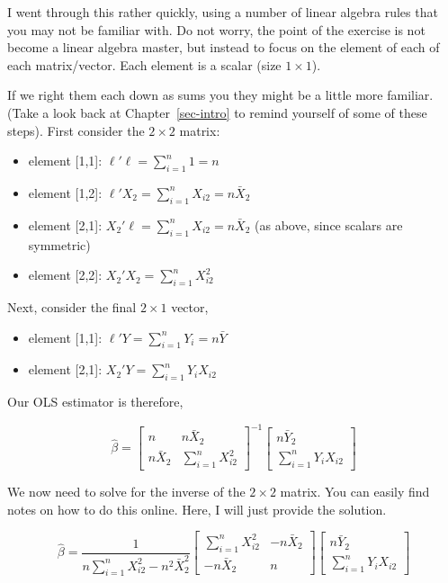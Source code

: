 \documentclass[
  letterpaper,
  DIV=11,
  numbers=noendperiod]{scrreprt}
\begin{document}
I went through this rather quickly, using a number of linear algebra
rules that you may not be familiar with. Do not worry, the point of the
exercise is not become a linear algebra master, but instead to focus on
the element of each of each matrix/vector. Each element is a scalar
(size \(1\times 1\)).

If we right them each down as sums you they might be a little more
familiar. (Take a look back at Chapter~\ref{sec-intro} to remind
yourself of some of these steps). First consider the \(2\times 2\)
matrix:

\begin{itemize}
\item
  element {[}1,1{]}: \(\ell'\ell = \sum_{i=1}^n 1 = n\)
\item
  element {[}1,2{]}: \(\ell'X_2 = \sum_{i=1}^nX_{i2} = n\bar{X}_2\)
\item
  element {[}2,1{]}: \(X_2'\ell = \sum_{i=1}^nX_{i2} = n\bar{X}_2\) (as
  above, since scalars are symmetric)
\item
  element {[}2,2{]}: \(X_2'X_2=\sum_{i=1}^nX_{i2}^2\)
\end{itemize}

Next, consider the final \(2\times 1\) vector,

\begin{itemize}
\item
  element {[}1,1{]}: \(\ell'Y = \sum_{i=1}^n Y_i = n\bar{Y}\)
\item
  element {[}2,1{]}: \(X_2'Y = \sum_{i=1}^nY_iX_{i2}\)
\end{itemize}

Our OLS estimator is therefore,

\[
\hat{\beta} = \begin{bmatrix} n & n\bar{X}_2 \\ n\bar{X}_2 & \sum_{i=1}^nX_{i2}^2 \end{bmatrix}^{-1}\begin{bmatrix}n\bar{Y}_2  \\ \sum_{i=1}^nY_iX_{i2} \end{bmatrix}
\]

We now need to solve for the inverse of the \(2\times 2\) matrix. You
can easily find notes on how to do this online. Here, I will just
provide the solution.

\[
\hat{\beta} = \frac{1}{n\sum_{i=1}^nX_{i2}^2-n^2\bar{X}_2^2}\begin{bmatrix} \sum_{i=1}^nX_{i2}^2 & -n\bar{X}_2 \\ -n\bar{X}_2 &  n\end{bmatrix}\begin{bmatrix}n\bar{Y}_2  \\ \sum_{i=1}^nY_iX_{i2} \end{bmatrix}
\]
\end{document}
